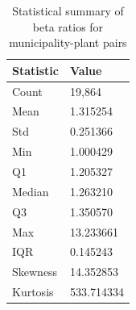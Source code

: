 \begin{table}
\caption{Statistical summary of beta ratios for municipality-plant pairs}
\label{tab:beta_statistics}
\begin{tabular}{ll}
\toprule
Statistic & Value \\
\midrule
Count & 19,864 \\
Mean & 1.315254 \\
Std & 0.251366 \\
Min & 1.000429 \\
Q1 & 1.205327 \\
Median & 1.263210 \\
Q3 & 1.350570 \\
Max & 13.233661 \\
IQR & 0.145243 \\
Skewness & 14.352853 \\
Kurtosis & 533.714334 \\
\bottomrule
\end{tabular}
\end{table}
